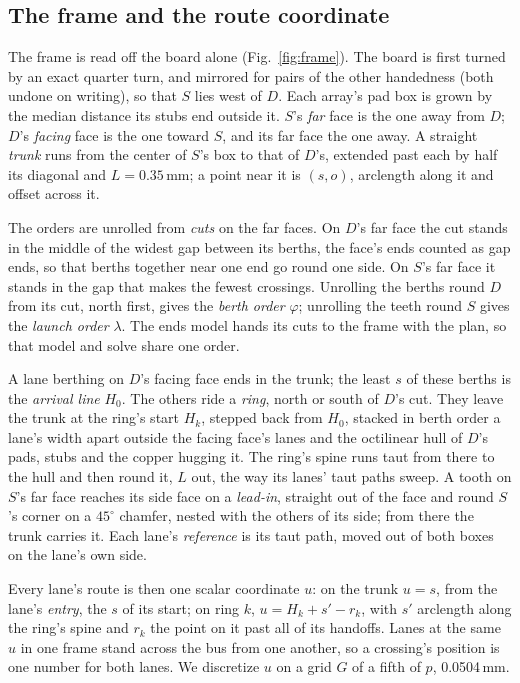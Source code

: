 \documentclass[journal]{IEEEtran}
\begin{document}
\subsection{The frame and the route coordinate}
\label{sec:frame}
The frame is read off the board alone (Fig.~\ref{fig:frame}). The board is first turned by an exact quarter turn, and mirrored for pairs of the other handedness (both undone on writing), so that $S$ lies west of $D$. Each array's pad box is grown by the median distance its stubs end outside it. $S$'s \emph{far} face is the one away from $D$; $D$'s \emph{facing} face is the one toward $S$, and its far face the one away. A straight \emph{trunk} runs from the center of $S$'s box to that of $D$'s, extended past each by half its diagonal and $L=0.35$\,mm; a point near it is $(s,o)$, arclength along it and offset across it.

The orders are unrolled from \emph{cuts} on the far faces. On $D$'s far face the cut stands in the middle of the widest gap between its berths, the face's ends counted as gap ends, so that berths together near one end go round one side. On $S$'s far face it stands in the gap that makes the fewest crossings. Unrolling the berths round $D$ from its cut, north first, gives the \emph{berth order} $\varphi$; unrolling the teeth round $S$ gives the \emph{launch order} $\lambda$. The ends model hands its cuts to the frame with the plan, so that model and solve share one order.

A lane berthing on $D$'s facing face ends in the trunk; the least $s$ of these berths is the \emph{arrival line} $H_0$. The others ride a \emph{ring}, north or south of $D$'s cut. They leave the trunk at the ring's start $H_k$, stepped back from $H_0$, stacked in berth order a lane's width apart outside the facing face's lanes and the octilinear hull of $D$'s pads, stubs and the copper hugging it. The ring's spine runs taut from there to the hull and then round it, $L$ out, the way its lanes' taut paths sweep. A tooth on $S$'s far face reaches its side face on a \emph{lead-in}, straight out of the face and round $S$'s corner on a $45^\circ$ chamfer, nested with the others of its side; from there the trunk carries it. Each lane's \emph{reference} is its taut path, moved out of both boxes on the lane's own side.

Every lane's route is then one scalar coordinate $u$: on the trunk $u=s$, from the lane's \emph{entry}, the $s$ of its start; on ring $k$, $u=H_k+s'-r_k$, with $s'$ arclength along the ring's spine and $r_k$ the point on it past all of its handoffs. Lanes at the same $u$ in one frame stand across the bus from one another, so a crossing's position is one number for both lanes. We discretize $u$ on a grid $G$ of a fifth of $p$, 0.0504\,mm.
\end{document}
